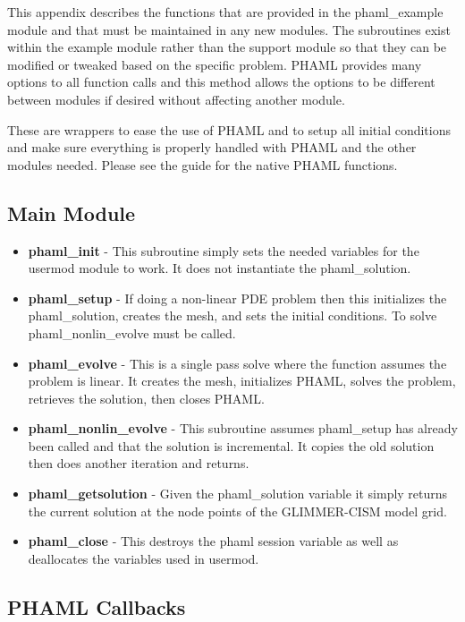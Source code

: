 
This appendix describes the functions that are provided in the phaml\_example module and that must be maintained in any new modules.  The subroutines exist within the example module rather than the support module so that they can be modified or tweaked based on the specific problem.  PHAML provides many options to all function calls and this method allows the options to be different between modules if desired without affecting another module.

These are wrappers to ease the use of PHAML and to setup all initial conditions and make sure everything is properly handled with PHAML and the other modules needed.  Please see the guide for the native PHAML functions. \citep{phamldoc} 

\subsection{Main Module}\label{sec:libfuncmain}

\begin{itemize}
\item \textbf{phaml\_init} - This subroutine simply sets the needed variables for the usermod module to work.  It does not instantiate the phaml\_solution.
\item \textbf{phaml\_setup} - If doing a non-linear PDE problem then this initializes the phaml\_solution, creates the mesh, and sets the initial conditions.  To solve phaml\_nonlin\_evolve must be called.
\item \textbf{phaml\_evolve} - This is a single pass solve where the function assumes the problem is linear.  It creates the mesh, initializes PHAML, solves the problem, retrieves the solution, then closes PHAML.
\item \textbf{phaml\_nonlin\_evolve} - This subroutine assumes phaml\_setup has already been called and that the solution is incremental.  It copies the old solution then does another iteration and returns.
\item \textbf{phaml\_getsolution} - Given the phaml\_solution variable it simply returns the current solution at the node points of the GLIMMER-CISM model grid. 
\item \textbf{phaml\_close} - This destroys the phaml session variable as well as deallocates the variables used in usermod.
\end{itemize}

\subsection{PHAML Callbacks}\label{sec:libphamlcall}

